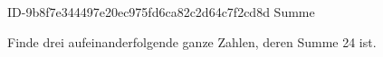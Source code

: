 \begin{exercise}
      {ID-9b8f7e344497e20ec975fd6ca82c2d64c7f2cd8d}
      {Summe}
  \ifproblem\problem\par
    Finde drei aufeinanderfolgende ganze Zahlen, deren Summe 24 ist.
  \fi
\end{exercise}
